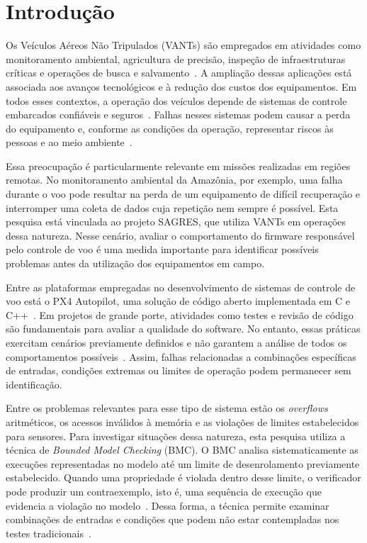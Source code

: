 \chapter{Introdução}
\label{cap:introducao}

Os Veículos Aéreos Não Tripulados (VANTs) são empregados em atividades como monitoramento ambiental, agricultura de precisão, inspeção de infraestruturas críticas e operações de busca e salvamento~\cite{Wanner2024,Siddiqi2022}. A ampliação dessas aplicações está associada aos avanços tecnológicos e à redução dos custos dos equipamentos. Em todos esses contextos, a operação dos veículos depende de sistemas de controle embarcados confiáveis e seguros~\cite{Mohsan2023}. Falhas nesses sistemas podem causar a perda do equipamento e, conforme as condições da operação, representar riscos às pessoas e ao meio ambiente~\cite{Wanner2024}.

Essa preocupação é particularmente relevante em missões realizadas em regiões remotas. No monitoramento ambiental da Amazônia, por exemplo, uma falha durante o voo pode resultar na perda de um equipamento de difícil recuperação e interromper uma coleta de dados cuja repetição nem sempre é possível. Esta pesquisa está vinculada ao projeto SAGRES, que utiliza VANTs em operações dessa natureza. Nesse cenário, avaliar o comportamento do firmware responsável pelo controle de voo é uma medida importante para identificar possíveis problemas antes da utilização dos equipamentos em campo.

Entre as plataformas empregadas no desenvolvimento de sistemas de controle de voo está o PX4 Autopilot, uma solução de código aberto implementada em C e C++~\cite{PX4_GitHub}. Em projetos de grande porte, atividades como testes e revisão de código são fundamentais para avaliar a qualidade do software. No entanto, essas práticas exercitam cenários previamente definidos e não garantem a análise de todos os comportamentos possíveis~\cite{Godefroid2005}. Assim, falhas relacionadas a combinações específicas de entradas, condições extremas ou limites de operação podem permanecer sem identificação.

Entre os problemas relevantes para esse tipo de sistema estão os \textit{overflows} aritméticos, os acessos inválidos à memória e as violações de limites estabelecidos para sensores. Para investigar situações dessa natureza, esta pesquisa utiliza a técnica de \textit{Bounded Model Checking} (BMC). O BMC analisa sistematicamente as execuções representadas no modelo até um limite de desenrolamento previamente estabelecido. Quando uma propriedade é violada dentro desse limite, o verificador pode produzir um contraexemplo, isto é, uma sequência de execução que evidencia a violação no modelo~\cite{Biere1999}. Dessa forma, a técnica permite examinar combinações de entradas e condições que podem não estar contempladas nos testes tradicionais~\cite{Beyer2022}.

